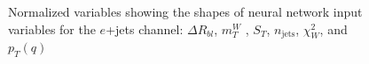 \begin{figure}[h!]
\vspace{-4.5mm}
\hfil
{}
\caption{Normalized variables showing the shapes of neural network input variables for the $e$+jets channel: $\Delta R_{b l}$, $m_{T}^{W}$ , $S_T$, $n_{\text{jets}}$, $\chi^{2}_{W}$, and $p_T (q)$}
\label{fig:VarPlotsej2}
\end{figure}


